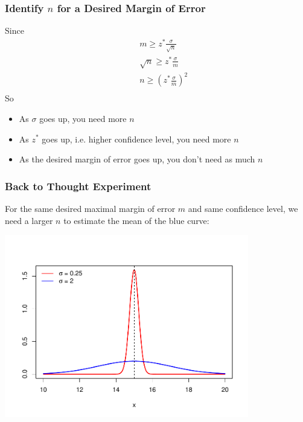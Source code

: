 \documentclass[handout]{beamer}
\begin{document}
\begin{frame}
\frametitle{Identify $n$ for a Desired Margin of Error}
Since
\begin{eqnarray*}
&&m \geq z^*\frac{\sigma}{\sqrt{n}}\\
&& \sqrt{n} \geq z^*\frac{\sigma}{m}\\
&& n \geq \left(z^*\frac{\sigma}{m}\right)^2\\
\end{eqnarray*}
\pause So
\begin{itemize}
\pause\item As $\sigma$ goes up, you need more $n$
\pause\item As $z^*$ goes up, i.e. higher confidence level, you need more $n$
\pause\item As the desired margin of error goes up, you don't need as much $n$
\end{itemize}

\end{frame}


\begin{frame}
\frametitle{Back to Thought Experiment}
For the same desired maximal margin of error $m$ and same confidence level, we need a larger $n$ to estimate the mean of the blue curve:
\begin{center}
\includegraphics[width=0.8\textwidth]{figure/norm.pdf}
\end{center}
\end{frame}
\end{document}
